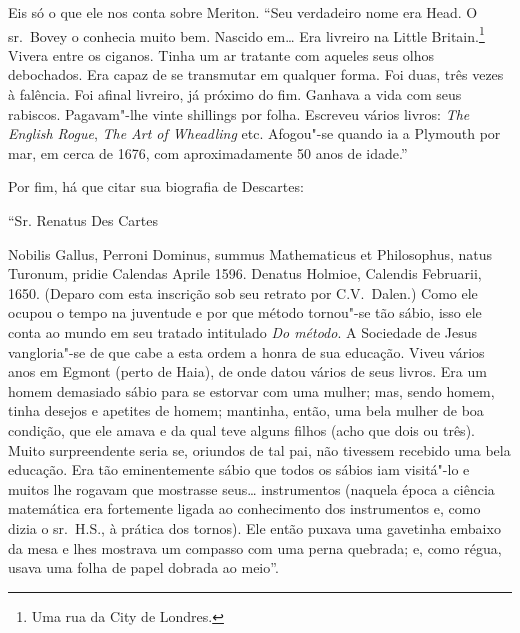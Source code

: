 Eis só o que ele nos conta sobre Meriton. “Seu verdadeiro nome
era Head. O sr.~Bovey o conhecia muito bem. Nascido em\ldots{} Era
livreiro na Little Britain.\footnote{ Uma rua da City de Londres.} 
Vivera entre os ciganos. Tinha um ar tratante com aqueles
seus olhos debochados. Era capaz de se transmutar em qualquer forma. Foi
duas, três vezes à falência. Foi afinal livreiro, já próximo do fim.
Ganhava a vida com seus rabiscos. Pagavam"-lhe vinte shillings por
folha. Escreveu vários livros: \textit{The English Rogue}, \textit{The Art of
Wheadling} etc. Afogou"-se quando ia a Plymouth por mar, em cerca
de 1676, com aproximadamente 50 anos de idade.”


Por fim, há que citar sua biografia de Descartes:

``Sr. Renatus Des Cartes

Nobilis Gallus, Perroni Dominus, summus Mathematicus et
Philosophus, natus Turonum, pridie Calendas Aprile 1596. Denatus Holmioe,
Calendis Februarii, 1650. (Deparo com esta inscrição sob seu
retrato por C.V.~Dalen.) Como ele ocupou o tempo na juventude e por que
método tornou"-se tão sábio, isso ele conta ao mundo em seu tratado
intitulado \textit{Do método}. A Sociedade de Jesus vangloria"-se de que
cabe a esta ordem a honra de sua educação. Viveu vários anos em Egmont
(perto de Haia), de onde datou vários de seus livros. Era um homem
demasiado sábio para se estorvar com uma mulher; mas, sendo homem, tinha
desejos e apetites de homem; mantinha, então, uma bela mulher de boa
condição, que ele amava e da qual teve alguns filhos (acho que dois ou
três). Muito surpreendente seria se, oriundos de tal pai, não tivessem
recebido uma bela educação. Era tão eminentemente sábio que todos os
sábios iam visitá"-lo e muitos lhe rogavam que mostrasse seus\ldots{}
instrumentos (naquela época a ciência matemática era fortemente ligada ao
conhecimento dos instrumentos e, como dizia o sr.~H.S., à prática dos
tornos). Ele então puxava uma gavetinha embaixo da mesa e lhes mostrava um
compasso com uma perna quebrada; e, como régua, usava uma folha de papel
dobrada ao meio”.

